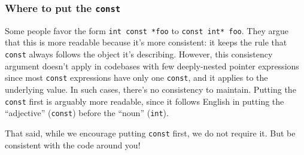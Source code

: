 \subsubsection{Where to put the \texttt{const}}
Some people favor the form \texttt{int const *foo} to \texttt{const int* foo}. They argue that this is more readable because it's more consistent: it keeps the rule that \texttt{const} always follows the object it's describing. However, this consistency argument doesn't apply in codebases with few deeply-nested pointer expressions since most \texttt{const} expressions have only one \texttt{const}, and it applies to the underlying value. In such cases, there's no consistency to maintain. Putting the \texttt{const} first is arguably more readable, since it follows English in putting the \enquote{adjective} (\texttt{const}) before the \enquote{noun} (\texttt{int}).

That said, while we encourage putting \texttt{const} first, we do not require it. But be consistent with the code around you!
